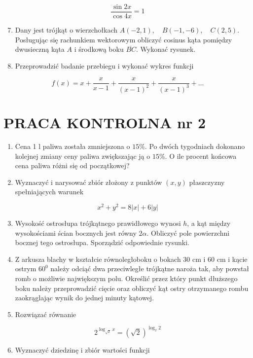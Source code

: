 \documentclass[10pt]{article}
\begin{document}
$$
\frac{\sin 2 x}{\cos 4 x}=1
$$

\begin{enumerate}
  \setcounter{enumi}{6}
  \item Dany jest trójkąt o wierzchołkach $A(-2,1), \quad B(-1,-6), \quad C(2,5)$. Posługując się rachunkiem wektorowym obliczyć cosinus kąta pomiędzy dwusieczną kąta $A$ i środkową boku $\overline{B C}$. Wykonać rysunek.
  \item Przeprowadzić badanie przebiegu i wykonać wykres funkcji
\end{enumerate}

$$
f(x)=x+\frac{x}{x-1}+\frac{x}{(x-1)^{2}}+\frac{x}{(x-1)^{3}}+\ldots
$$

\section*{PRACA KONTROLNA nr 2}
\begin{enumerate}
  \item Cena 1 l paliwa została zmniejszona o $15 \%$. Po dwóch tygodniach dokonano kolejnej zmiany ceny paliwa zwiększając ją o $15 \%$. O ile procent końcowa cena paliwa różni się od początkowej?
  \item Wyznaczyć i narysować zbiór złożony z punktów $(x, y)$ płaszczyzny spełniających warunek
\end{enumerate}

$$
x^{2}+y^{2}=8|x|+6|y|
$$

\begin{enumerate}
  \setcounter{enumi}{2}
  \item Wysokość ostrosłupa trójkątnego prawidłowego wynosi $h$, a kąt między wysokościami ścian bocznych jest równy $2 \alpha$. Obliczyć pole powierzchni bocznej tego ostrosłupa. Sporządzić odpowiednie rysunki.
  \item Z arkusza blachy w kształcie równoległoboku o bokach 30 cm i 60 cm i kącie ostrym $60^{0}$ należy odciąć dwa przeciwległe trójkątne naroża tak, aby powstał romb o możliwie największym polu. Określić przez który punkt dłuższego boku należy przeprowadzić cięcie oraz obliczyć kąt ostry otrzymanego rombu zaokrąglając wynik do jednej minuty kątowej.
  \item Rozwiązać równanie
\end{enumerate}

$$
2^{\log _{\sqrt{2}} x}=(\sqrt{2})^{\log _{x} 2}
$$

\begin{enumerate}
  \setcounter{enumi}{5}
  \item Wyznaczyć dziedzinę i zbiór wartości funkcji
\end{enumerate}
\end{document}
